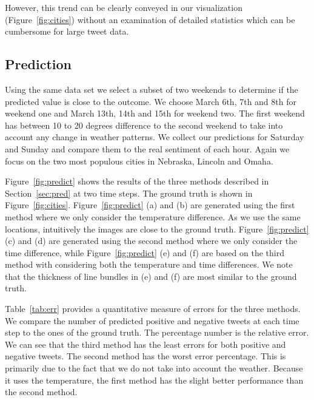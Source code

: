 However, this trend can be clearly conveyed in our visualization (Figure~\ref{fig:cities}) without an examination of detailed statistics which can be cumbersome for large tweet data.


\subsection{Prediction}
\label{sec:caseprediction}

Using the same data set we select a subset of two weekends to determine if the predicted value is close to the outcome. We choose March 6th, 7th and 8th for weekend one and March 13th, 14th and 15th for weekend two. The first weekend has between 10 to 20 degrees difference to the second weekend to take into account any change in weather patterns. We collect our predictions for Saturday and Sunday and compare them to the real sentiment of each hour. Again we focus on the two most populous cities in Nebraska, Lincoln and Omaha.

Figure~\ref{fig:predict} shows the results of the three methods described in Section~\ref{sec:pred} at two time steps. The ground truth is shown in Figure~\ref{fig:cities}. Figure~\ref{fig:predict} (a) and (b) are generated using the first method where we only consider the temperature difference. As we use the same locations, intuitively the images are close to the ground truth. Figure~\ref{fig:predict} (c) and (d) are generated using the second method where we only consider the time difference, while Figure~\ref{fig:predict} (e) and (f) are based on the third method with considering both the temperature and time differences. We note that the thickness of line bundles in (e) and (f) are most similar to the ground truth.

Table~\ref{tab:err} provides a quantitative measure of errors for the three methods. We compare the number of predicted positive and negative tweets at each time step to the ones of the ground truth. The percentage number is the relative error. We can see that the third method has the least errors for both positive and negative tweets. The second method has the worst error percentage. This is primarily due to the fact that we do not take into account the weather. Because it uses the temperature, the first method has the slight better performance than the second method.

